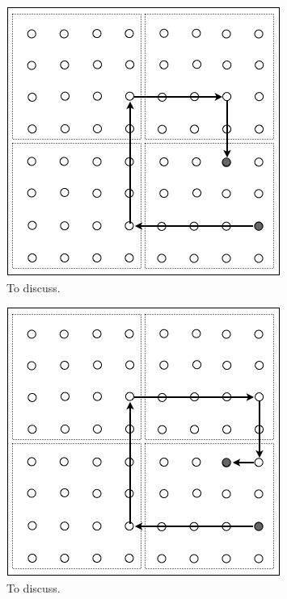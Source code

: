 \begin{itemize}
{ \begin{figure}[hbt]
\begin{center}
       \includegraphics[scale=0.4]{FiguresGraph/routingCitySolution1}
       \caption{To discuss.}
  \label{fig:routingCity}
\end{center}
\end{figure}
 \begin{figure}[hbt]
\begin{center}
       \includegraphics[scale=0.4]{FiguresGraph/routingCity2}
       \caption{To discuss.}
\end{center}
\end{figure}
 \begin{figure}[hbt]
\begin{center}

\end{center}
\end{figure}}
\end{itemize}
